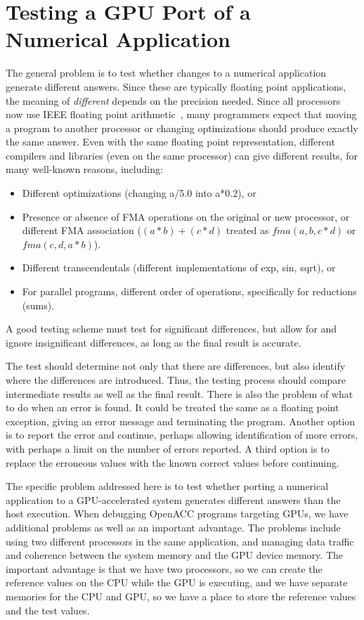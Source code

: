 \section{Testing a GPU Port of a Numerical Application}

The general problem is to test whether changes to a numerical application generate different answers.
Since these are typically floating point applications, the meaning of \emph{different} depends on the precision needed.
Since all processors now use IEEE floating point arithmetic~\cite{goldberg.cs.91}, many programmers expect that moving a program to another processor or changing optimizations should produce exactly the same answer.
Even with the same floating point representation, different compilers and libraries (even on the same processor) can give different results, for many well-known reasons, including:
\begin{itemize}
\item Different optimizations (changing a/5.0 into a*0.2), or
\item Presence or absence of FMA operations on the original or new processor, or different FMA association ($(a*b)+(c*d)$ treated as $\textit{fma}(a,b,c*d)$ or $\textit{fma}(c,d,a*b)$).
\item Different transcendentals (different implementations of exp, sin, sqrt), or
\item For parallel programs, different order of operations, specifically for reductions (sums).
\end{itemize}
A good testing scheme must test for significant differences, but allow for and ignore insignificant differences, as long as the final result is accurate.

The test should determine not only that there are differences, but also identify where the differences are introduced.
Thus, the testing process should compare intermediate results as well as the final result.
There is also the problem of what to do when an error is found.
It could be treated the same as a floating point exception, giving an error message and terminating the program.
Another option is to report the error and continue, perhaps allowing identification of more errors, with perhaps a limit on the number of errors reported.
A third option is to replace the erroneous values with the known correct values before continuing.

The specific problem addressed here is to test whether porting a numerical application to a GPU-accelerated system generates different answers than the host execution.
When debugging OpenACC programs targeting GPUs, we have additional problems as well as an important advantage.
The problems include using two different processors in the same application, and managing data traffic and coherence between the system memory and the GPU device memory.
The important advantage is that we have two processors, so we can create the reference values on the CPU while the GPU is executing, and we have separate memories for the CPU and GPU, so we have a place to store the reference values and the test values.


